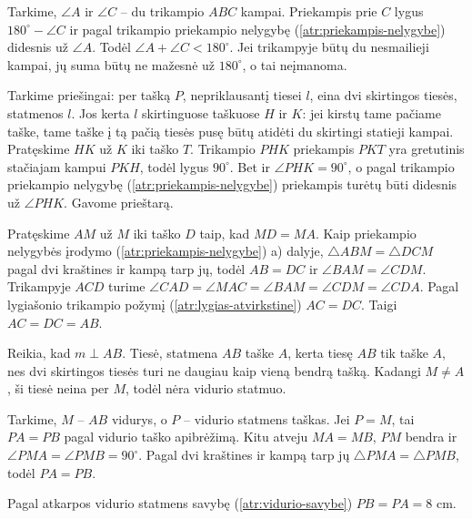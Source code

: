 \documentclass[12pt,a4paper,reqno]{amsart}
\theoremstyle{plain}\newtheorem{theorem}{Teorema}[section]
\theoremstyle{definition}
\theoremstyle{remark}\newtheorem{remark}[theorem]{Pastaba}\newtheorem*{remark*}{Pastaba}
\theoremstyle{definition}\newtheorem*{problem*}{Uždavinys}
\begin{document}
\begin{solution}[\ref{uzd:priekampis-suma}] Tarkime, $\angle A$ ir $\angle C$ – du trikampio $ABC$ kampai. Priekampis prie $C$ lygus $180^\circ-\angle C$ ir pagal trikampio priekampio nelygybę (\ref{atr:priekampis-nelygybe}) didesnis už $\angle A$. Todėl $\angle A+\angle C<180^\circ$. Jei trikampyje būtų du nesmailieji kampai, jų suma būtų ne mažesnė už $180^\circ$, o tai neįmanoma. \end{solution}
\begin{solution}[\ref{atr:statmuo}] Tarkime priešingai: per tašką $P$, nepriklausantį tiesei $l$, eina dvi skirtingos tiesės, statmenos $l$. Jos kerta $l$ skirtinguose taškuose $H$ ir $K$: jei kirstų tame pačiame taške, tame taške į tą pačią tiesės pusę būtų atidėti du skirtingi statieji kampai. Pratęskime $HK$ už $K$ iki taško $T$. Trikampio $PHK$ priekampis $PKT$ yra gretutinis stačiajam kampui $PKH$, todėl lygus $90^\circ$. Bet ir $\angle PHK=90^\circ$, o pagal trikampio priekampio nelygybę (\ref{atr:priekampis-nelygybe}) priekampis turėtų būti didesnis už $\angle PHK$. Gavome prieštarą.\par
 \end{solution}
\begin{solution}[\ref{uzd:priekampis-pusiaukrastine}] Pratęskime $AM$ už $M$ iki taško $D$ taip, kad $MD=MA$. Kaip priekampio nelygybės įrodymo (\ref{atr:priekampis-nelygybe}) a) dalyje, $\triangle ABM=\triangle DCM$ pagal dvi kraštines ir kampą tarp jų, todėl $AB=DC$ ir $\angle BAM=\angle CDM$. Trikampyje $ACD$ turime $\angle CAD=\angle MAC=\angle BAM=\angle CDM=\angle CDA$. Pagal lygiašonio trikampio požymį (\ref{atr:lygias-atvirkstine}) $AC=DC$. Taigi $AC=DC=AB$. \end{solution}
\begin{solution}[\ref{uzd:vidurio-supratimas-01}] Reikia, kad $m\perp AB$. Tiesė, statmena $AB$ taške $A$, kerta tiesę $AB$ tik taške $A$, nes dvi skirtingos tiesės turi ne daugiau kaip vieną bendrą tašką. Kadangi $M\ne A$, ši tiesė neina per $M$, todėl nėra vidurio statmuo. \end{solution}
\begin{solution}[\ref{atr:vidurio-savybe}] Tarkime, $M$ – $AB$ vidurys, o $P$ – vidurio statmens taškas. Jei $P=M$, tai $PA=PB$ pagal vidurio taško apibrėžimą. Kitu atveju $MA=MB$, $PM$ bendra ir $\angle PMA=\angle PMB=90^\circ$. Pagal dvi kraštines ir kampą tarp jų $\triangle PMA=\triangle PMB$, todėl $PA=PB$. \end{solution}
\begin{solution}[\ref{uzd:vidurio-savybe-01}] Pagal atkarpos vidurio statmens savybę (\ref{atr:vidurio-savybe}) $PB=PA=8$ cm. \end{solution}
\end{document}
